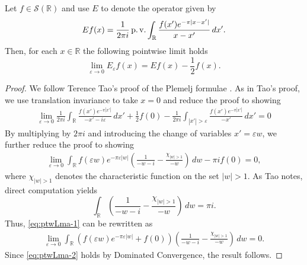 \documentclass[../dissertation.tex]{subfiles}
\begin{document}
\begin{lma}
	\label{lma:ptwise-Lim} 
	Let $f \in \mathscr S(\mathbb R)$ and use $E$ to denote
	the operator given by
	\[
		Ef(x) =\frac{1}{2\pi i} \operatorname{p.v.} \int_{\mathbb R} \frac{f(x') e^{-\pi|x - x'|}}{x-x'}\,dx'.
	\]
	Then, for each $x \in \mathbb R$ the following pointwise limit holds
	\[
		\lim_{\varepsilon\to 0} E_\varepsilon f(x) = Ef(x) - \frac{1}{2} f(x).
	\]
\end{lma}
\begin{proof}
    We follow Terence Tao's proof of the Plemelj formulae \cite{Tao}. 
    As in Tao's proof, we use translation invariance to take $x = 0$ and reduce the proof 
    to showing
    \begin{align*} %
        \lim_{\varepsilon\to 0} \frac{1}{2\pi i} 
            \int_{\mathbb R} \frac{f(x') e^{-\pi|x'|}}{-x'-i\varepsilon}\,dx'    
            + \frac{1}{2} f(0) 
            - \frac{1}{2\pi i} \int_{|x'|>\varepsilon} \frac{f(x') e^{-\pi|x'|}}{-x'}\,dx' = 0
    \end{align*}
    By multiplying by $2 \pi i$ and introducing the change of variables $x' = \varepsilon w$, we
    further reduce the proof to showing
    \begin{align} \label{eq:ptwLma-1}
        \lim_{\varepsilon\to 0} \int_{\mathbb R} f(\varepsilon w) e^{-\pi\varepsilon|w|}
            \left( \frac{1}{-w-i}  - \frac{\chi_{|w| > 1}}{-w}\right)  \,dw
            - \pi i f(0) = 0,
    \end{align}
    where $\chi_{|w|>1}$ denotes the characteristic function on the set $|w|>1$.
    As Tao notes, direct computation yields
    \[
        \int_{\mathbb R} \left( \frac{1}{-w-i}  - \frac{\chi_{|w| > 1}}{-w}\right)  \,dw
            = \pi i.
    \]
    Thus, \eqref{eq:ptwLma-1} can be rewritten as
    \begin{align}\label{eq:ptwLma-2}
        \lim_{\varepsilon\to 0} 
        	\int_{\mathbb R} 
        		\left(
        			f(\varepsilon w) e^{-\pi \varepsilon|w|} + f(0)
        		\right)
            	\left( 
            		\frac{1}{-w-i}  - \frac{\chi_{|w| > 1}}{-w}
            	\right)  
            \,dw
             = 0.
    \end{align}
    Since \eqref{eq:ptwLma-2} holds by Dominated Convergence, the result follows.
\end{proof}
\end{document}
